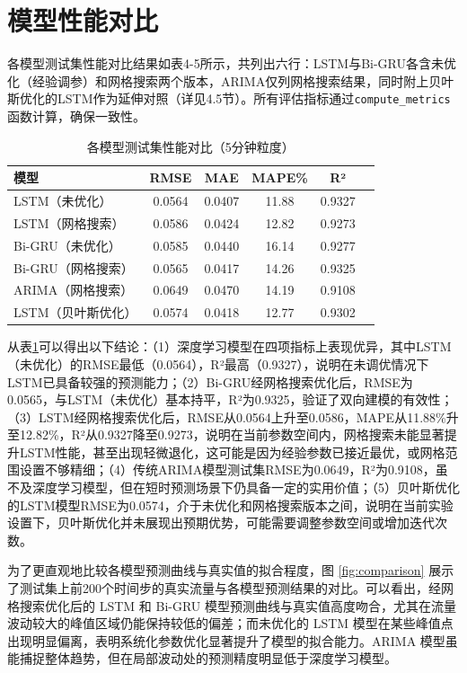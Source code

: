 \documentclass[12pt,a4paper,oneside]{ctexbook}
\begin{document}
	\section{模型性能对比}
	
	各模型测试集性能对比结果如表4-5所示，共列出六行：LSTM与Bi-GRU各含未优化（经验调参）和网格搜索两个版本，ARIMA仅列网格搜索结果，同时附上贝叶斯优化的LSTM作为延伸对照（详见4.5节）。所有评估指标通过\texttt{compute\_metrics}函数计算，确保一致性。
	
	\begin{table}[H]
		\centering
		\caption{各模型测试集性能对比（5分钟粒度）}
		\label{tab:performance}
		\begin{tabular}{lccccc}
			\toprule
			模型 & RMSE & MAE & MAPE\% & R² \\
			\midrule
			LSTM（未优化）     & 0.0564 & 0.0407 & 11.88 & 0.9327 \\
			LSTM（网格搜索）   & 0.0586 & 0.0424 & 12.82 & 0.9273 \\
			Bi-GRU（未优化）   & 0.0585 & 0.0440 & 16.14 & 0.9277 \\
			Bi-GRU（网格搜索） & 0.0565 & 0.0417 & 14.26 & 0.9325 \\
			ARIMA（网格搜索）  & 0.0649 & 0.0470 & 14.19 & 0.9108 \\
			LSTM（贝叶斯优化） & 0.0574 & 0.0418 & 12.77 & 0.9302 \\
			\bottomrule
		\end{tabular}
	\end{table}
	
	从表\ref{tab:performance}可以得出以下结论：（1）深度学习模型在四项指标上表现优异，其中LSTM（未优化）的RMSE最低（0.0564），R²最高（0.9327），说明在未调优情况下LSTM已具备较强的预测能力；（2）Bi-GRU经网格搜索优化后，RMSE为0.0565，与LSTM（未优化）基本持平，R²为0.9325，验证了双向建模的有效性；（3）LSTM经网格搜索优化后，RMSE从0.0564上升至0.0586，MAPE从11.88\%升至12.82\%，R²从0.9327降至0.9273，说明在当前参数空间内，网格搜索未能显著提升LSTM性能，甚至出现轻微退化，这可能是因为经验参数已接近最优，或网格范围设置不够精细；（4）传统ARIMA模型测试集RMSE为0.0649，R²为0.9108，虽不及深度学习模型，但在短时预测场景下仍具备一定的实用价值；（5）贝叶斯优化的LSTM模型RMSE为0.0574，介于未优化和网格搜索版本之间，说明在当前实验设置下，贝叶斯优化并未展现出预期优势，可能需要调整参数空间或增加迭代次数。
	
	为了更直观地比较各模型预测曲线与真实值的拟合程度，图 \ref{fig:comparison} 展示了测试集上前200个时间步的真实流量与各模型预测结果的对比。可以看出，经网格搜索优化后的 LSTM 和 Bi-GRU 模型预测曲线与真实值高度吻合，尤其在流量波动较大的峰值区域仍能保持较低的偏差；而未优化的 LSTM 模型在某些峰值点出现明显偏离，表明系统化参数优化显著提升了模型的拟合能力。ARIMA 模型虽能捕捉整体趋势，但在局部波动处的预测精度明显低于深度学习模型。
	
\end{document}
